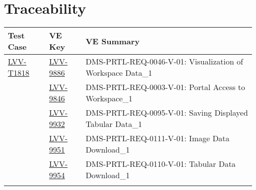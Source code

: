 \section{Traceability}

\begin{longtable}{p{3cm}p{3cm}L{9cm}}
\hline
\textbf{Test Case} & \textbf{VE Key} & \textbf{VE Summary} \\ \hline
  \href{https://jira.lsstcorp.org/secure/Tests.jspa#/testCase/LVV-T1818}{LVV-T1818} &
  \href{https://jira.lsstcorp.org/browse/LVV-9886}{LVV-9886}
  & DMS-PRTL-REQ-0046-V-01: Visualization of Workspace Data\_1
 \\ 
      &
  \href{https://jira.lsstcorp.org/browse/LVV-9846}{LVV-9846}
  & DMS-PRTL-REQ-0003-V-01: Portal Access to Workspace\_1
 \\ 
      &
  \href{https://jira.lsstcorp.org/browse/LVV-9932}{LVV-9932}
  & DMS-PRTL-REQ-0095-V-01: Saving Displayed Tabular Data\_1
 \\ 
      &
  \href{https://jira.lsstcorp.org/browse/LVV-9951}{LVV-9951}
  & DMS-PRTL-REQ-0111-V-01: Image Data Download\_1
 \\ 
      &
  \href{https://jira.lsstcorp.org/browse/LVV-9954}{LVV-9954}
  & DMS-PRTL-REQ-0110-V-01: Tabular Data Download\_1
 \\ 
\hline
\end{longtable}
